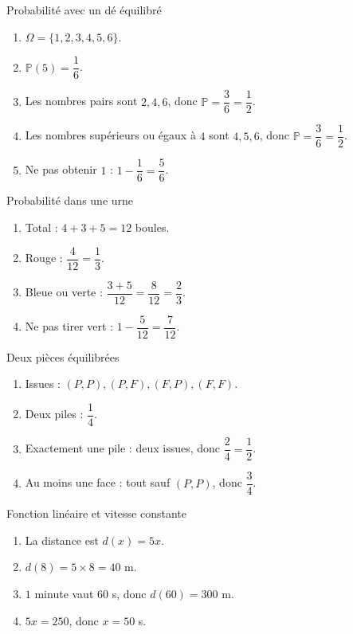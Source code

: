 \documentclass[11pt,a4paper]{article}
\newcommand{\Prob}{\mathbb{P}}
\newcounter{corr}
\begin{document}
\begin{corrbox}{Probabilité avec un dé équilibré}
\begin{enumerate}
\item $\Omega=\{1,2,3,4,5,6\}$.
\item $\Prob(5)=\dfrac16$.
\item Les nombres pairs sont $2,4,6$, donc $\Prob=\dfrac36=\dfrac12$.
\item Les nombres supérieurs ou égaux à $4$ sont $4,5,6$, donc $\Prob=\dfrac36=\dfrac12$.
\item Ne pas obtenir $1$ : $1-\dfrac16=\dfrac56$.
\end{enumerate}
\end{corrbox}

\begin{corrbox}{Probabilité dans une urne}
\begin{enumerate}
\item Total : $4+3+5=12$ boules.
\item Rouge : $\dfrac{4}{12}=\dfrac13$.
\item Bleue ou verte : $\dfrac{3+5}{12}=\dfrac{8}{12}=\dfrac23$.
\item Ne pas tirer vert : $1-\dfrac{5}{12}=\dfrac{7}{12}$.
\end{enumerate}
\end{corrbox}

\begin{corrbox}{Deux pièces équilibrées}
\begin{enumerate}
\item Issues : $(P,P),(P,F),(F,P),(F,F)$.
\item Deux piles : $\dfrac14$.
\item Exactement une pile : deux issues, donc $\dfrac24=\dfrac12$.
\item Au moins une face : tout sauf $(P,P)$, donc $\dfrac34$.
\end{enumerate}
\end{corrbox}

\begin{corrbox}{Fonction linéaire et vitesse constante}
\begin{enumerate}
\item La distance est $d(x)=5x$.
\item $d(8)=5\times8=40$ m.
\item $1$ minute vaut $60$ s, donc $d(60)=300$ m.
\item $5x=250$, donc $x=50$ s.
\end{enumerate}
\end{corrbox}
\end{document}
